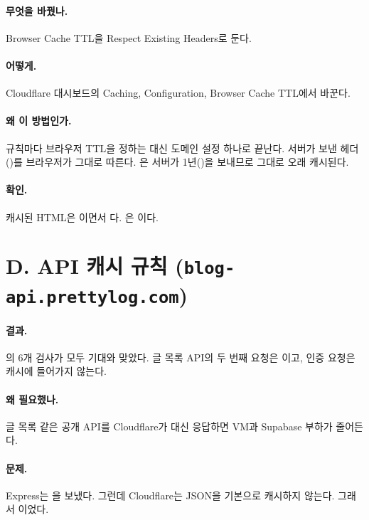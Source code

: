 \paragraph{무엇을 바꿨나.}
Browser Cache TTL을 Respect Existing Headers로 둔다.

\paragraph{어떻게.}
Cloudflare 대시보드의 Caching, Configuration, Browser Cache TTL에서 바꾼다.

\paragraph{왜 이 방법인가.}
규칙마다 브라우저 TTL을 정하는 대신 도메인 설정 하나로 끝난다.
서버가 보낸 헤더()를 브라우저가 그대로 따른다.
은 서버가 1년()을 보내므로 그대로 오래 캐시된다.

\paragraph{확인.}
캐시된 HTML은 이면서 다.
은 이다.

\section{D. API 캐시 규칙 (\texttt{blog-api.prettylog.com})}\label{sec:rt-d}

\paragraph{결과.}
의 6개 검사가 모두 기대와 맞았다.
글 목록 API의 두 번째 요청은 이고, 인증 요청은 캐시에 들어가지 않는다.

\paragraph{왜 필요했나.}
글 목록 같은 공개 API를 Cloudflare가 대신 응답하면 VM과 Supabase 부하가 줄어든다.

\paragraph{문제.}
Express는 을 보냈다.
그런데 Cloudflare는 JSON을 기본으로 캐시하지 않는다.
그래서 이었다.

